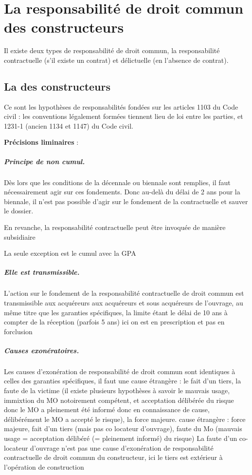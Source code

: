 
\chapter{La responsabilité de droit commun des constructeurs}

Il existe deux types de responsabilité de droit commun, la responsabilité contractuelle (s’il existe un contrat) et délictuelle (en l’absence de contrat).

\section{La \rcdc des constructeurs}

	Ce sont les hypothèses de responsabilités fondées sur les articles 1103 du Code civil : les conventions légalement formées tiennent lieu de loi entre les parties, et 1231-1 (ancien 1134 et 1147) du Code civil.

	\textbf{Précisions liminaires} :
	\paragraph{Principe de non cumul.} Dès lors que les conditions de la décennale ou biennale sont remplies, il faut nécessairement agir sur ces fondements. Donc au-delà du délai de 2 ans pour la biennale, il n’est pas possible d’agir sur le fondement de la contractuelle et sauver le dossier.

	En revanche, la responsabilité contractuelle peut être invoquée de manière subsidiaire

	La seule exception est le cumul avec la GPA
	\paragraph{Elle est transmissible.} L’action sur le fondement de la responsabilité contractuelle de droit commun est transmissible aux acquéreurs aux acquéreurs et sous acquéreurs de l’ouvrage, au même titre que les garanties spécifiques, la limite étant le délai de 10 ans à compter de la réception (parfois 5 ans) ici on est en prescription et pas en forclusion
	\paragraph{Causes exonératoires.} Les causes d’exonération de responsabilité de droit commun sont identiques à celles des garanties spécifiques, il faut une cause étrangère : le fait d’un tiers, la faute de la victime \MO (il existe plusieurs hypothèses à savoir le mauvais usage, immixtion du MO notoirement compétent, et acceptation délibérée du risque donc le MO a pleinement été informé donc en connaissance de cause, délibérément le MO a accepté le risque), la force majeure.
	cause étrangère : force majeure, fait d'un tiers (mais pas co locateur d'ouvrage), faute du Mo (mauvais usage = acceptation délibéré (= pleinement informé) du risque)
	La faute d’un co-locateur d’ouvrage n’est pas une cause d’exonération de responsabilité contractuelle de droit commun du constructeur, ici le tiers est extérieur à l’opération de construction
